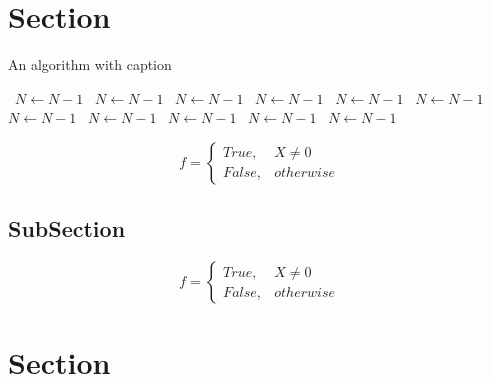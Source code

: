 \documentclass[a4paper]{article}
\begin{document}
\section{Section}

\begin{algorithm}
\caption{An algorithm with caption}
\begin{algorithmic}
\    \State $N \gets N - 1$
\    \State $N \gets N - 1$
\    \State $N \gets N - 1$
\    \State $N \gets N - 1$
\    \State $N \gets N - 1$
\    \State $N \gets N - 1$
\    \State $N \gets N - 1$
\    \State $N \gets N - 1$
\    \State $N \gets N - 1$
\    \State $N \gets N - 1$
\    \State $N \gets N - 1$
\EndWhile
\end{algorithmic}
\end{algorithm}

\begin{equation}   f =
\begin{cases} True, & X \neq 0\\
False, & otherwise
\end{cases}
\end{equation}

\subsection{SubSection}

\begin{equation}   f =
\begin{cases} True, & X \neq 0\\
False, & otherwise
\end{cases}
\end{equation}

\section{Section}
\end{document}

